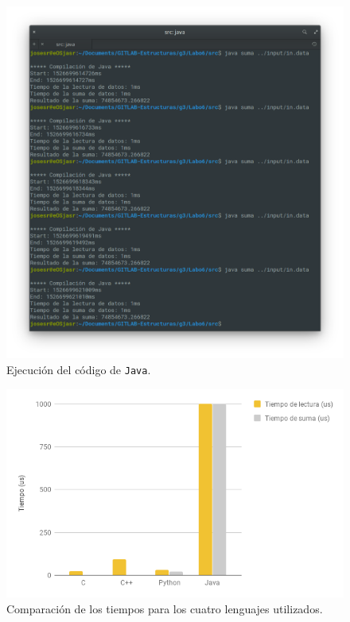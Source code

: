 \begin{figure}[H]
\centering
\includegraphics[width=\textwidth]{imgs/Labo6/resJAVA.png}
\caption{Ejecución del código de \texttt{Java}.}
\label{fig:Java}
\end{figure}

\begin{figure}[H]
\centering
\includegraphics[width=\textwidth]{imgs/Labo6/chart.png}
\caption{Comparación de los tiempos para los cuatro lenguajes utilizados.}
\label{fig:chart}
\end{figure}

